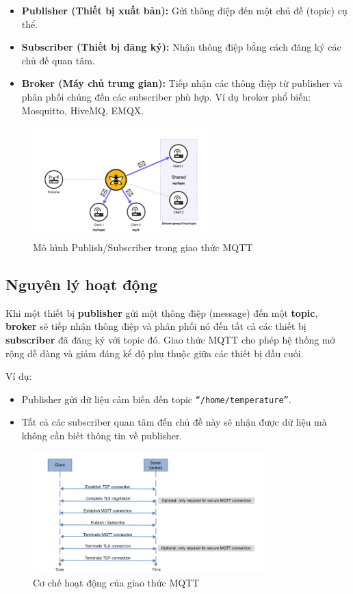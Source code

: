 \begin{itemize}
    \item \textbf{Publisher (Thiết bị xuất bản):} Gửi thông điệp đến một chủ đề (topic) cụ thể.
    \item \textbf{Subscriber (Thiết bị đăng ký):} Nhận thông điệp bằng cách đăng ký các chủ đề quan tâm.
    \item \textbf{Broker (Máy chủ trung gian):} Tiếp nhận các thông điệp từ publisher và phân phối chúng đến các subscriber phù hợp. Ví dụ broker phổ biến: Mosquitto, HiveMQ, EMQX.
\end{itemize}
\begin{figure}[H]
  \centering
  \includegraphics[width=0.6\textwidth]{Images/mo-hinh-mqtt.png}
  \caption{Mô hình Publish/Subscriber trong giao thức MQTT}
\end{figure}
\subsection{Nguyên lý hoạt động}

Khi một thiết bị \textbf{publisher} gửi một thông điệp (message) đến một \textbf{topic}, \textbf{broker} sẽ tiếp nhận thông điệp và phân phối nó đến tất cả các thiết bị \textbf{subscriber} đã đăng ký với topic đó. Giao thức MQTT cho phép hệ thống mở rộng dễ dàng và giảm đáng kể độ phụ thuộc giữa các thiết bị đầu cuối.

Ví dụ:
\begin{itemize}
    \item Publisher gửi dữ liệu cảm biến đến topic \texttt{``/home/temperature''}.
    \item Tất cả các subscriber quan tâm đến chủ đề này sẽ nhận được dữ liệu mà không cần biết thông tin về publisher.
\end{itemize}
\begin{figure}[H]
  \centering
  \includegraphics[width=0.8\textwidth]{Images/mqtt-data-1.png}
  \caption{Cơ chế hoạt động của giao thức MQTT}
\end{figure}
